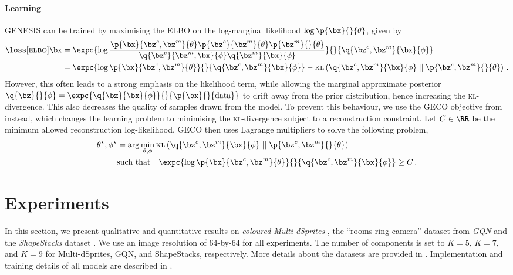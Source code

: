 \documentclass{article}
\begin{document}
\paragraph{Learning}
\Gls{GENESIS} can be trained by maximising the \gls{ELBO} on the log-marginal likelihood $\log\p{\bx}{}{\theta}$, given by
\begin{align}
    \loss[\textsc{elbo}]{\bx} &= \expc{\log \frac{ \p{\bx}{\bz^c,\bz^m}{\theta} \p{\bz^c}{\bz^m}{\theta} \p{\bz^m}{}{\theta}}{\q{\bz^c}{\bz^m,\bx}{\phi} \q{\bz^m}{\bx}{\phi}} }{}{{\q{\bz^c,\bz^m}{\bx}{\phi}}} \label{eq:elbo}\\
    &= \expc{\log\p{\bx}{\bz^c,\bz^m}{\theta} }{}{{\q{\bz^c,\bz^m}{\bx}{\phi}}} -
    \operatorname{\textsc{kl}} \left(
        \q{\bz^c,\bz^m}{\bx}{\phi} \mid\mid \p{\bz^c,\bz^m}{}{\theta}
    \right) \label{eq:decomposed_elbo}
    \,.
\end{align}
However, this often leads to a strong emphasis on the likelihood term, while allowing the marginal approximate posterior $\q{\bz}{}{\phi} = \expc{ \q{\bz}{\bx}{\phi} }{}{\p{\bx}{}{\textrm{data}}}$ to drift away from the prior distribution, hence increasing the \textsc{kl}-divergence.
This also decreases the quality of samples drawn from the model.
To prevent this behaviour, we use the \gls{GECO} objective from \citet{rezende2018taming} instead, which changes the learning problem to minimising the \textsc{kl}-divergence subject to a reconstruction constraint.
Let $C \in \RR$ be the minimum allowed reconstruction log-likelihood, \gls{GECO} then uses Lagrange multipliers to solve the following problem,
\begin{equation}
    \begin{aligned}
    \theta^\star, \phi^\star &= \arg\min_{\theta, \phi}
    \operatorname{\textsc{kl}} \left(
        \q{\bz^c,\bz^m}{\bx}{\phi} \mid\mid \p{\bz^c,\bz^m}{}{\theta}
    \right)\\
    &\text{such that}\quad
    \expc{\log\p{\bx}{\bz^c,\bz^m}{\theta} }{}{{\q{\bz^c,\bz^m}{\bx}{\phi}}} \geq C\,.
    \end{aligned}
\end{equation}
 

\section{Experiments}
\label{sec:experimental_results}

In this section, we present qualitative and quantitative results on \emph{coloured Multi-dSprites} \citep{burgess2019monet}, the ``rooms-ring-camera'' dataset from \emph{GQN} \citep{eslami2018neural} and the \emph{ShapeStacks} dataset \citep{groth2018shapestacks}.
We use an image resolution of 64-by-64 for all experiments.
The number of components is set to $K=5$, $K=7$, and $K=9$ for Multi-dSprites, GQN, and \mbox{ShapeStacks}, respectively.
More details about the datasets are provided in .
Implementation and training details of all models are described in .
\end{document}
